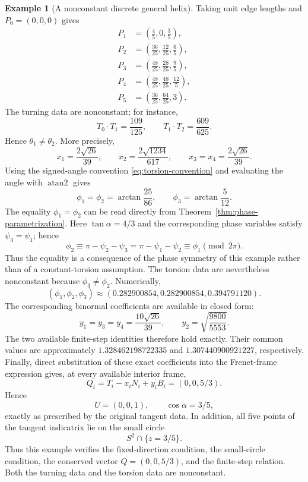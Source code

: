 \documentclass[10pt,a4paper]{amsart}
\theoremstyle{definition}
\newtheorem{example}[theorem]{Example}
\theoremstyle{remark}
\numberwithin{equation}{section}
\begin{document}
\begin{example}[A nonconstant discrete general helix]
Taking unit edge lengths and \(P_0=(0,0,0)\) gives
\[
\begin{aligned}
P_1&=\left(\frac45,0,\frac35\right),\\
P_2&=\left(\frac{36}{25},\frac{12}{25},\frac65\right),\\
P_3&=\left(\frac{48}{25},\frac{28}{25},\frac95\right),\\
P_4&=\left(\frac{48}{25},\frac{48}{25},\frac{12}{5}\right),\\
P_5&=\left(\frac{36}{25},\frac{64}{25},3\right).
\end{aligned}
\]
The turning data are nonconstant; for instance,
\[
T_0\cdot T_1=\frac{109}{125},
\qquad
T_1\cdot T_2=\frac{609}{625}.
\]
Hence \(\theta_1\neq\theta_2\).  More precisely,
\[
x_1=\frac{2\sqrt{26}}{39},\qquad
x_2=\frac{2\sqrt{1234}}{617},\qquad
x_3=x_4=\frac{2\sqrt{26}}{39}.
\]
Using the signed-angle convention \eqref{eq:torsion-convention} and evaluating the angle with $\operatorname{atan2}$ gives
\[
\phi_1=\phi_2=\arctan\frac{25}{86},
\qquad
\phi_3=\arctan\frac{5}{12}.
\]
The equality $\phi_1=\phi_2$ can be read directly from Theorem~\ref{thm:phase-parametrization}. Here $\tan\alpha=4/3$ and the corresponding phase variables satisfy $\psi_3=\psi_1$; hence
\[
\phi_2\equiv\pi-\psi_2-\psi_3=\pi-\psi_1-\psi_2\equiv\phi_1\pmod{2\pi}.
\]
Thus the equality is a consequence of the phase symmetry of this example rather than of a constant-torsion assumption.  The torsion data are nevertheless nonconstant because $\phi_3\ne\phi_2$. Numerically,
\[
(\phi_1,\phi_2,\phi_3)
\approx(0.282900854,0.282900854,0.394791120).
\]
The corresponding binormal coefficients are available in closed form:
\[
y_1=y_3=y_4=\frac{10\sqrt{26}}{39},
\qquad
y_2=\sqrt{\frac{9800}{5553}}.
\]
The two available finite-step identities therefore hold exactly. Their common values are approximately
$1.328462198722335$ and $1.307440900921227$, respectively.
Finally, direct substitution of these exact coefficients into the Frenet-frame expression gives, at every available interior frame,
\[
Q_i=T_i-x_iN_i+y_iB_i=(0,0,5/3).
\] Hence
\[
U=(0,0,1),\qquad \cos\alpha=3/5,
\]
exactly as prescribed by the original tangent data.  In addition, all
five points of the tangent indicatrix lie on the small circle
\[
S^2\cap\{z=3/5\}.
\]
Thus this example verifies the fixed-direction condition, the small-circle condition, the conserved vector $Q=(0,0,5/3)$, and the finite-step relation. Both the turning data and the torsion data are nonconstant.
\end{example}
\end{document}
